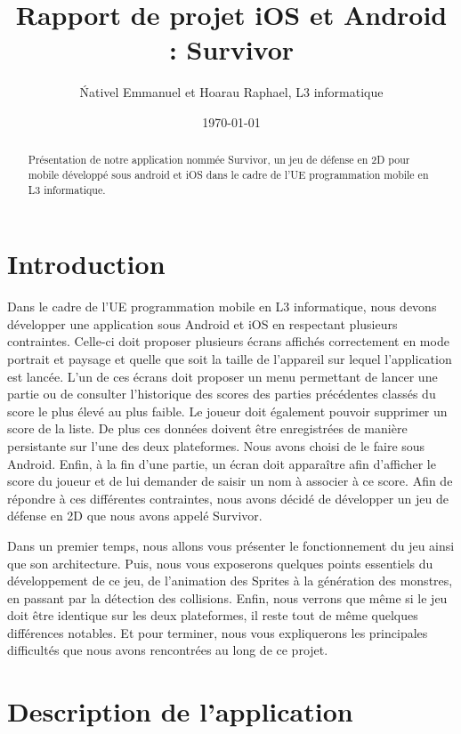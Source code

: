 \documentclass{article}
\title{Rapport de projet iOS et Android : Survivor}
\author{\'Nativel Emmanuel et Hoarau Raphael,  L3 informatique}
\date{\today}
\begin{document}
\maketitle %


\begin{abstract}
  Présentation de notre application nommée Survivor,  un jeu de défense en 2D pour mobile développé sous android et iOS dans le cadre de l'UE programmation mobile en L3 informatique.
\end{abstract}

\section{Introduction}
\label{section:introduction}

Dans le cadre de l'UE programmation mobile en L3 informatique, nous devons développer une application sous Android et iOS en respectant plusieurs contraintes. Celle-ci doit proposer plusieurs écrans affichés correctement en mode portrait et paysage et quelle que soit la taille de l'appareil sur lequel l'application est lancée. L'un de ces écrans doit proposer un menu permettant de lancer une partie ou de consulter l'historique des scores des parties précédentes classés du score le plus élevé au plus faible. Le joueur doit également pouvoir supprimer un score de la liste. De plus ces données doivent être enregistrées de manière persistante sur l'une des deux plateformes. Nous avons choisi de le faire sous Android. Enfin, à la fin d'une partie, un écran doit apparaître afin d'afficher le score du joueur et de lui demander de saisir un nom à associer à ce score.
Afin de répondre à ces différentes contraintes, nous avons décidé de développer un jeu de défense en 2D que nous avons appelé Survivor.

Dans un premier temps, nous allons vous présenter le fonctionnement du jeu ainsi que son architecture. Puis, nous vous exposerons quelques points essentiels du développement de ce jeu, de l'animation des Sprites à la génération des monstres, en passant par la détection des collisions. Enfin, nous verrons que même si le jeu doit être identique sur les deux plateformes, il reste tout de même quelques différences notables. Et pour terminer, nous vous expliquerons les principales difficultés que nous avons rencontrées au long de ce projet.

\section{Description de l'application}
\end{document}
